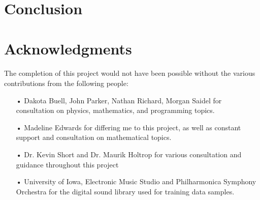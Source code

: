 \documentclass[12pt,letterpaper]{article}
\begin{document}

\newpage
\section{Conclusion}
\label{sec-Conclusion}



\newpage
\section{Acknowledgments}
\label{sec-Acknowledge}

\paragraph*{}The completion of this project would not have been possible without the various contributions from the following people:

\begin{itemize}

\item[•]Dakota Buell, John Parker, Nathan Richard, Morgan Saidel for consultation on physics, mathematics, and programming topics.

\item[•]Madeline Edwards for differing me to this project, as well as constant support and consultation on mathematical topics.

\item[•]Dr. Kevin Short and Dr. Maurik Holtrop for various consultation and guidance throughout this project

\item[•]University of Iowa, Electronic Music Studio and Philharmonica Symphony Orchestra for the digital sound library used for training data samples.

\end{itemize}


\newpage
\end{document}
